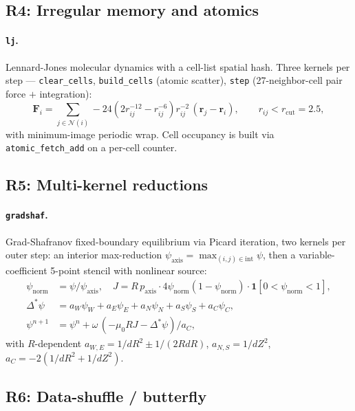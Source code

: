 \documentclass{article}
\theoremstyle{plain}
\theoremstyle{definition}
\theoremstyle{remark}
\begin{document}
\subsection{R4: Irregular memory and atomics}

\paragraph{\texttt{lj}.} Lennard-Jones molecular dynamics with a cell-list
spatial hash. Three kernels per step --- \texttt{clear\_cells},
\texttt{build\_cells} (atomic scatter), \texttt{step}
(27-neighbor-cell pair force $+$ integration):
\begin{equation}
\mathbf{F}_i = \sum_{j\in\mathcal{N}(i)} -24\!\left(2r_{ij}^{-12}-r_{ij}^{-6}\right)r_{ij}^{-2}\,(\mathbf{r}_j-\mathbf{r}_i),
\qquad r_{ij}<r_{\mathrm{cut}}=2.5,
\end{equation}
with minimum-image periodic wrap. Cell occupancy is built via
\texttt{atomic\_fetch\_add} on a per-cell counter.

\subsection{R5: Multi-kernel reductions}

\paragraph{\texttt{gradshaf}.} Grad-Shafranov fixed-boundary equilibrium via
Picard iteration, two kernels per outer step: an interior
max-reduction
$\psi_{\mathrm{axis}}=\max_{(i,j)\in\mathrm{int}}\psi$, then a
variable-coefficient 5-point stencil with nonlinear source:
\begin{align}
\psi_{\mathrm{norm}} &= \psi/\psi_{\mathrm{axis}},\quad
J = R\,p_{\mathrm{axis}}\cdot 4\psi_{\mathrm{norm}}(1-\psi_{\mathrm{norm}})\cdot
   \mathbf{1}[0<\psi_{\mathrm{norm}}<1],\\
\Delta^*\psi &= a_W\psi_W+a_E\psi_E+a_N\psi_N+a_S\psi_S+a_C\psi_C,\\
\psi^{n+1} &= \psi^n + \omega\,(-\mu_0 R J - \Delta^*\psi)/a_C,
\end{align}
with $R$-dependent $a_{W,E}=1/dR^2 \pm 1/(2RdR)$, $a_{N,S}=1/dZ^2$,
$a_C=-2(1/dR^2+1/dZ^2)$.

\subsection{R6: Data-shuffle / butterfly}
\end{document}
